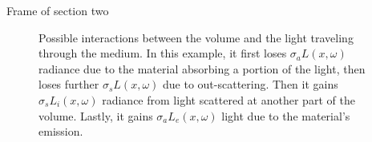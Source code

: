 \documentclass[
  english,            %
  aspectratio=169,    %
]{tumbeamer}
\begin{document}
\begin{frame}{Frame of section two}
\begin{figure}[ht]
    \centering
    
    \caption{
        Possible interactions between the volume and the light traveling through the medium. In this example, it first loses $\sigma_a L(x, \omega)$ radiance due to the material absorbing a portion of the light, then loses further $\sigma_s L(x, \omega)$ due to out-scattering. Then it gains $\sigma_s L_i(x, \omega)$ radiance from light scattered at another part of the volume. Lastly, it gains $\sigma_a L_e(x, \omega)$ light due to the material's emission.
    }
    \label{fig:interactions}
\end{figure}
\end{frame}
\end{document}
